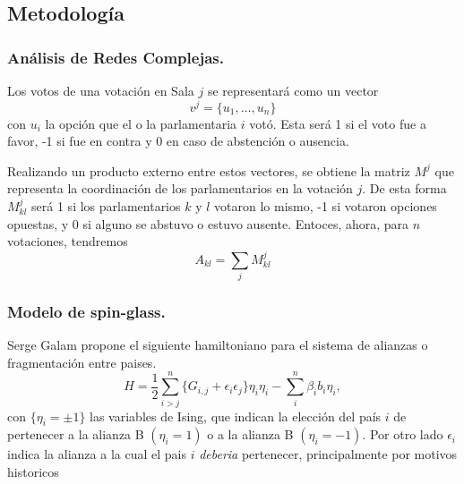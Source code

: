 \documentclass{proyectotesis}
\begin{document}
\subsection{Metodología}
\subsubsection{Análisis de Redes Complejas.}

Los votos de una votación en Sala $j$ se representará como un vector 
\begin{equation}
    v^j = \{u_1,\dots,u_n\}
\end{equation}
con $u_i$ la opción que el o la parlamentaria $i$ votó. Esta será 1 si el voto fue a favor, -1 si fue en contra y 0 en caso de abstención o ausencia.

Realizando un producto externo entre estos vectores, se obtiene la matriz $M^j$ que representa la coordinación de los parlamentarios en la votación $j$. De esta forma $M^j_{kl}$ será 1 si los parlamentarios $k$ y $l$ votaron lo mismo, -1 si votaron opciones opuestas, y 0 si alguno se abstuvo o estuvo ausente. Entoces, ahora, para $n$ votaciones, tendremos
\begin{equation}
    A_{kl} = \sum_j M^j_{kl}
\end{equation}


%
%

\subsubsection{Modelo de spin-glass.} Serge Galam propone el siguiente hamiltoniano para el sistema de alianzas o fragmentación entre paises.
\begin{equation}
    H = \frac{1}{2} \sum_{i>j}^n \{G_{i,j} + \epsilon_i \epsilon_j\}\eta_i \eta_i - \sum_i^n \beta_i b_i \eta_i
,\end{equation}
con $\{\eta_i = \pm 1 \}$ las variables de Ising, que indican la elección del país $i$ de pertenecer a la alianza B $(\eta_i = 1)$ o a la alianza B $(\eta_i = -1)$. Por otro lado $\epsilon_i$ indica la alianza a la cual el pais $i$ \textit{deberia} pertenecer, principalmente por motivos historicos
\end{document}

